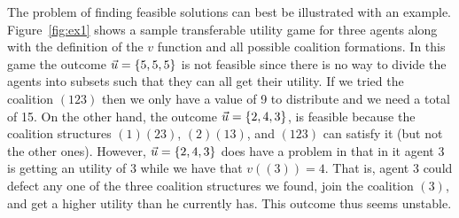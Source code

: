 \begin{SCfigure}
  \begin{minipage}{1.0\linewidth}
  \begin{center}
  \end{center}
  \end{minipage}
  \caption{Sample characteristic form game with transferable utility
    for three agents: 1, 2 and 3.  The table on the left shows the
    values of each coalition. On the right are the coalition
    structures. Below each one we calculate its value.}
  \label{fig:ex1}
\end{SCfigure}
The problem of finding feasible solutions can best be illustrated with
an example.  Figure~\ref{fig:ex1} shows a sample transferable utility
game for three agents along with the definition of the $v$ function
and all possible coalition formations. In this game the outcome $\vec{u} =
\{5,5,5\}$ is not feasible since there is no way to divide the agents
into subsets such that they can all get their utility. If we tried the
coalition $(123)$ then we only have a value of 9 to distribute and we
need a total of 15. On the other hand, the outcome $\vec{u} = \{2,4,3\}$,
is feasible because the coalition structures $(1)(23)$, $(2)(13)$, and
$(123)$ can satisfy it (but not the other ones). However, $\vec{u} =
\{2,4,3\}$ does have a problem in that in it agent 3 is getting an
utility of 3 while we have that $v((3)) = 4$. That is, agent 3 could
defect any one of the three coalition structures we found, join the
coalition $(3)$, and get a higher utility than he currently has. This
outcome thus seems unstable.

